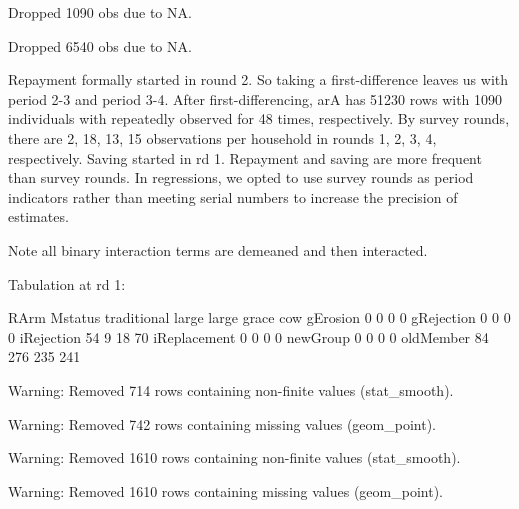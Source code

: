 \begin{Schunk}
\begin{Soutput}
Dropped 1090 obs due to NA.
\end{Soutput}
\begin{Soutput}
Dropped 6540 obs due to NA.
\end{Soutput}
\end{Schunk}
Repayment formally started in round 2. So taking a first-difference leaves us with period 2-3 and period 3-4. After first-differencing, \textsf{arA} has 51230 rows with 1090 individuals with repeatedly observed for 48 times, respectively. By survey rounds, there are 2, 18, 13, 15 observations per household in rounds 1, 2, 3, 4, respectively. Saving started in rd 1. Repayment and saving are more frequent than survey rounds. In regressions, we opted to use survey rounds as period indicators rather than meeting serial numbers to increase the precision of estimates.

Note all binary interaction terms are demeaned and then interacted.


Tabulation at rd 1:
\begin{Schunk}
\begin{Soutput}
              RArm
Mstatus        traditional large large grace cow
  gErosion               0     0           0   0
  gRejection             0     0           0   0
  iRejection            54     9          18  70
  iReplacement           0     0           0   0
  newGroup               0     0           0   0
  oldMember             84   276         235 241
\end{Soutput}
\end{Schunk}
\begin{Schunk}
\begin{Soutput}
Warning: Removed 714 rows containing non-finite values (stat_smooth).
\end{Soutput}
\begin{Soutput}
Warning: Removed 742 rows containing missing values (geom_point).
\end{Soutput}
\end{Schunk}
\begin{Schunk}
\begin{Soutput}
Warning: Removed 1610 rows containing non-finite values (stat_smooth).
\end{Soutput}
\begin{Soutput}
Warning: Removed 1610 rows containing missing values (geom_point).
\end{Soutput}
\end{Schunk}


